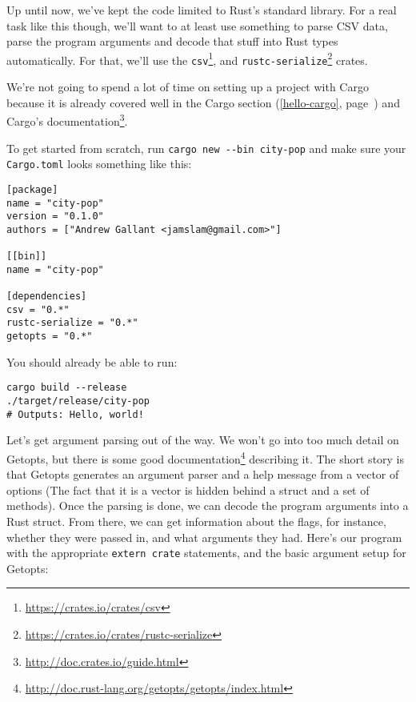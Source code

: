 \documentclass[a4paper,]{book}
\renewcommand*{\hyperref}[2][\ar]{%
  \def\ar{#2}%
  #2 (\autoref{#1}, page~\pageref{#1})}
\renewcommand{\href}[2]{#2\footnote{\url{#1}}}
\begin{document}
Up until now, we've kept the code limited to Rust's standard library.
For a real task like this though, we'll want to at least use something
to parse CSV data, parse the program arguments and decode that stuff
into Rust types automatically. For that, we'll use the
\href{https://crates.io/crates/csv}{\texttt{csv}}, and
\href{https://crates.io/crates/rustc-serialize}{\texttt{rustc-serialize}}
crates.


We're not going to spend a lot of time on setting up a project with
Cargo because it is already covered well in \hyperref[hello-cargo]{the
Cargo section} and \href{http://doc.crates.io/guide.html}{Cargo's
documentation}.

To get started from scratch, run \texttt{cargo\ new\ -\/-bin\ city-pop}
and make sure your \texttt{Cargo.toml} looks something like this:

\begin{verbatim}
[package]
name = "city-pop"
version = "0.1.0"
authors = ["Andrew Gallant <jamslam@gmail.com>"]

[[bin]]
name = "city-pop"

[dependencies]
csv = "0.*"
rustc-serialize = "0.*"
getopts = "0.*"
\end{verbatim}

You should already be able to run:

\begin{verbatim}
cargo build --release
./target/release/city-pop
# Outputs: Hello, world!
\end{verbatim}


Let's get argument parsing out of the way. We won't go into too much
detail on Getopts, but there is
\href{http://doc.rust-lang.org/getopts/getopts/index.html}{some good
documentation} describing it. The short story is that Getopts generates
an argument parser and a help message from a vector of options (The fact
that it is a vector is hidden behind a struct and a set of methods).
Once the parsing is done, we can decode the program arguments into a
Rust struct. From there, we can get information about the flags, for
instance, whether they were passed in, and what arguments they had.
Here's our program with the appropriate \texttt{extern\ crate}
statements, and the basic argument setup for Getopts:
\end{document}
